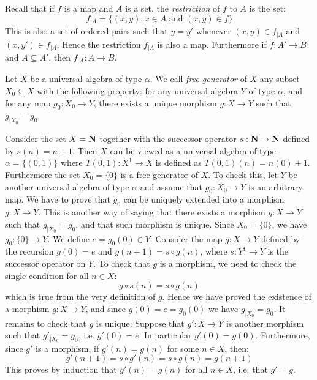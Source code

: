 Recall that if $f$ is a map and $A$ is a set, the {\em restriction} of $f$ to $A$ is the set:
    \[
    f_{|A}=\{(x,y): x\in A\mbox{\ and\ }(x,y)\in f\}
    \]
This is also a set of ordered pairs such that $y=y'$ whenever
$(x,y)\in f_{|A}$ and $(x,y')\in f_{|A}$. Hence the restriction
$f_{|A}$ is also a map. Furthermore if $f:A'\to B$ and $A\subseteq
A'$, then $f_{|A}:A\to B$.
\begin{defin}\label{logic:def:free:generator}
Let $X$ be a universal algebra of type $\alpha$. We call {\em free
generator} of $X$ any subset $X_{0}\subseteq X$ with the following
property: for any universal algebra $Y$ of type $\alpha$, and for
any map $g_{0}:X_{0}\to Y$, there exists a unique morphism $g:X\to
Y$ such that $g_{|X_{0}}=g_{0}$.
\end{defin}
Consider the set $X=\mbox{$\bf N$}$ together with the successor operator
$s:\mbox{$\bf N$}\to\mbox{$\bf N$}$ defined by $s(n)=n+1$. Then $X$ can be viewed as a
universal algebra of type $\alpha=\{(0,1)\}$ where $T(0,1):X^{1}\to
X$ is defined as $T(0,1)(n)=n(0)+1$. Furthermore the set
$X_{0}=\{0\}$ is a free generator of $X$. To check this, let $Y$ be
another universal algebra of type $\alpha$ and assume that
$g_{0}:X_{0}\to Y$ is an arbitrary map. We have to prove that
$g_{0}$ can be uniquely extended into a morphism $g:X\to Y$. This is
another way of saying that there exists a morphism $g:X\to Y$ such
that $g_{|X_{0}}=g_{0}$, and that such morphism is unique. Since
$X_{0}=\{0\}$, we have $g_{0}:\{0\}\to Y$. We define $e=g_{0}(0)\in
Y$. Consider the map $g:X\to Y$ defined by the recursion $g(0)=e$
and $g(n+1) = s\circ g(n)$, where $s:Y^{1}\to Y$ is the successor
operator on $Y$. To check that $g$ is a morphism, we need to check
the single condition for all $n\in X$:
    \[
    g\circ s(n) = s\circ g(n)
    \]
which is true from the very definition of $g$. Hence we have proved
the existence of a morphism $g:X\to Y$, and since $g(0) = e =
g_{0}(0)$ we have $g_{|X_{0}}=g_{0}$. It remains to check that $g$
is unique. Suppose that $g':X\to Y$ is another morphism such that
$g'_{|X_{0}}=g_{0}$, i.e. $g'(0)=e$. In particular $g'(0) = g(0)$.
Furthermore, since $g'$ is a morphism, if $g'(n)=g(n)$ for some
$n\in X$, then:
    \[
    g'(n+1) = s\circ g'(n) =  s\circ g(n) = g(n+1)
    \]
This proves by induction that $g'(n)=g(n)$ for all $n\in X$, i.e.
that $g'=g$.

